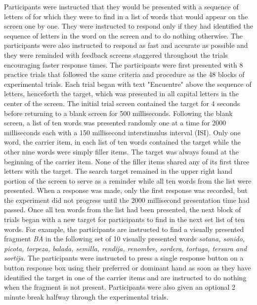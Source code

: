 \documentclass[
12pt, %
english, %
doublespacing, %
nolistspacing, %
liststotoc, %
headsepline, %
chapterinoneline, %
openany, %
]{DoctoralThesis}\usepackage[]{graphicx}\usepackage[]{color}
\begin{document}
Participants were instructed that they would be presented with a sequence of letters of for which they were to find in a list of words that would appear on the screen one by one. They were instructed to respond only if they had identified the sequence of letters in the word on the screen and to do nothing otherwise. The participants were also instructed to respond as fast and accurate as possible and they were reminded with feedback screens staggered throughout the trials encouraging faster response times. The participants were first presented with 8 practice trials that followed the same criteria and procedure as the 48 blocks of experimental trials. Each trial began with text "Encuentre" above the sequence of letters, henceforth the target, which was presented in all capital letters in the center of the screen. The initial trial screen contained the target for 4 seconds before returning to a blank screen for 500 milliseconds. Following the blank screen, a list of ten words was presented randomly one at a time for 2000 milliseconds each with a 150 millisecond interstimulus interval (ISI). Only one word, the carrier item, in each list of ten words contained the target while the other nine words were simply filler items. The target was always found at the beginning of the carrier item. None of the filler items shared any of its first three letters with the target. The search target remained in the upper right hand portion of the screen to serve as a reminder while all ten words from the list were presented. When a response was made, only the first response was recorded, but the experiment did not progress until the 2000 millisecond presentation time had passed. Once all ten words from the list had been presented, the next block of trials began with a new target for participants to find in the next set list of ten words. For example, the participants are instructed to find a visually presented fragment \emph{BA} in the following set of 10 visually presented words \emph{sotana, sonido, picota, torpeza, balada, semilla, rendija, renombre, sordera, tortuga, tersura and sortija}. The participants were instructed to press a single response button on a button response box using their preferred or dominant hand as soon as they have identified the target in one of the carrier items and are instructed to do nothing when the fragment is not present. Participants were also given an optional 2 minute break halfway through the experimental trials.

\end{document}
